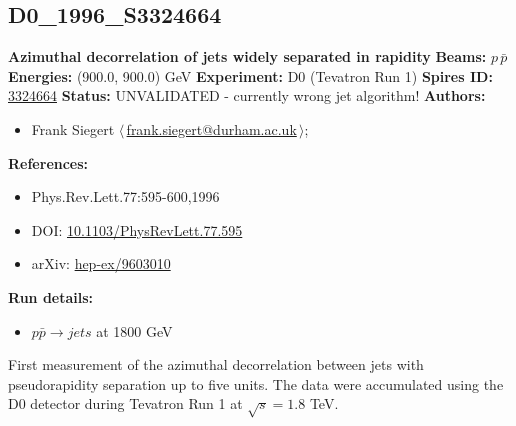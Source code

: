 \clearpage


\clearpage

\subsection[D0\_1996\_S3324664]{D0\_1996\_S3324664\,\cite{Abachi:1996et}}
\textbf{Azimuthal decorrelation of jets widely separated in rapidity}\newline
\textbf{Beams:} $p$\,$\bar{p}$ \newline
\textbf{Energies:} (900.0, 900.0) GeV \newline
\textbf{Experiment:} D0 (Tevatron Run 1) \newline
\textbf{Spires ID:} \href{http://www.slac.stanford.edu/spires/find/hep/www?rawcmd=key+3324664}{3324664}\newline
\textbf{Status:} UNVALIDATED - currently wrong jet algorithm!\newline
\textbf{Authors:}
\begin{itemize}
  \item Frank Siegert $\langle\,$\href{mailto:frank.siegert@durham.ac.uk}{frank.siegert@durham.ac.uk}$\,\rangle$;
\end{itemize}
\textbf{References:}
\begin{itemize}
  \item Phys.Rev.Lett.77:595-600,1996
  \item DOI: \href{http://dx.doi.org/10.1103/PhysRevLett.77.595}{10.1103/PhysRevLett.77.595}
  \item arXiv: \href{http://arxiv.org/abs/hep-ex/9603010}{hep-ex/9603010}
\end{itemize}
\textbf{Run details:}
\begin{itemize}

  \item $p \bar{p} \to jets$ at 1800 GeV\end{itemize}

\noindent First measurement of the azimuthal decorrelation between jets with pseudorapidity separation up to five units. The data were accumulated using the D0 detector during Tevatron Run 1 at $\sqrt{s}=1.8$ TeV.

\clearpage


\clearpage

